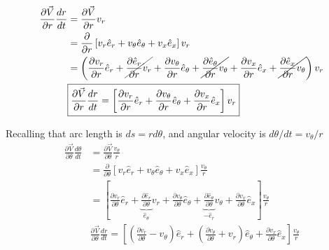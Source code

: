 \documentclass[12pt]{article}
\begin{document}
\begin{align*}
	\frac{\partial \vec{V}}{ \partial r}\frac{dr}{dt} 
	&= \frac{\partial \vec{V}}{ \partial r}v_r\\ 
	&= \frac{\partial}{\partial r}
 	\left[
 	v_r 	   \hat{e}_r +
 	v_{\theta} \hat{e}_{\theta} +
 	v_x		   \hat{e}_x
	\right]  v_r \\ 
	&=
 		\left(
 		\frac{\partial v_r}{\partial r} 		\hat{e}_r +
\cancel{\frac{\partial  \hat{e}_r}{\partial r} 		v_r}       +
 		\frac{\partial v_{\theta}}{\partial r}		\hat{e}_{\theta} +
\cancel{\frac{\partial \hat{e}_{\theta}}{\partial r} v_{\theta}}  +
 		\frac{\partial v_x}{\partial r}\hat{e}_{x} +
\cancel{\frac{\partial \hat{e}_{x}}{\partial r} v_{\theta}} \right) v_r\\ 
 		&\boxed{ 
 	\frac{\partial \vec{V}}{ \partial r}\frac{dr}{dt}     = \left[
 	\frac{\partial 		  v_r}{\partial r} 		\hat{e}_r +
 	\frac{\partial v_{\theta}}{\partial r}		\hat{e}_{\theta} +
	\frac{\partial v_x}{\partial r}\hat{e}_{x}\right] v_r} \\
\end{align*}

Recalling that arc length is $ds = rd\theta$, and angular velocity is $d\theta/dt = v_{\theta}/r$
\begin{align*}
	\frac{\partial \vec{V}}{ \partial \theta}\frac{d\theta}{dt} 
	&= \frac{\partial \vec{V}}{ \partial \theta}\frac{v_{\theta}}{r}\\
	&= \frac{\partial}{\partial \theta}
	\left[
	v_r 	   \hat{e}_r +
	v_{\theta} \hat{e}_{\theta} +
	v_x		   \hat{e}_x
	\right]  \frac{v_{\theta}}{r} \\
	& =
 	\left[
 		\frac{\partial v_r}{\partial \theta} 		\hat{e}_r +
\underbrace{\frac{\partial  \hat{e}_r}{\partial \theta}}_{\hat{e}_{\theta}} 		v_r       +
		\frac{\partial v_{\theta}}{\partial \theta}		\hat{e}_{\theta} +
\underbrace{\frac{\partial \hat{e}_{\theta}}{\partial \theta}}_{-\hat{e}_{r}}  v_{\theta}  +
		\frac{\partial v_x}{\partial \theta}\hat{e}_{x} 
	\right] \frac{v_{\theta}}{r} \\ 
&\boxed{ 
	\frac{\partial \vec{V}}{ \partial  \theta}\frac{dr}{dt}     = 
	\left[\left(\frac{\partial 		  v_r}{\partial \theta} - v_{\theta} \right)		\hat{e}_r +
	\left(\frac{\partial   v_{\theta}}{\partial \theta}	+ v_r	     \right)\hat{e}_{\theta} +
	\frac{\partial v_x}{\partial \theta}\hat{e}_{x}
	\right] \frac{v_{\theta}}{r}} \\
\end{align*}
\end{document}
